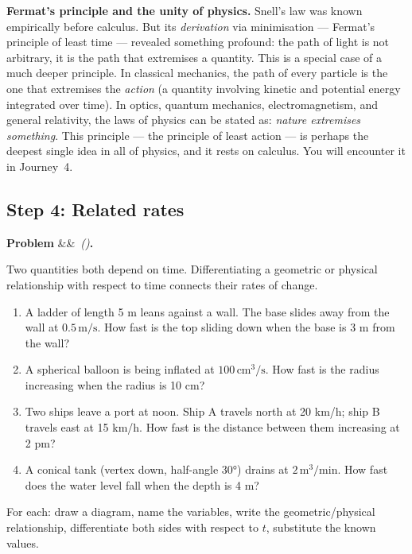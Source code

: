 \documentclass[12pt, a4paper]{article}
\newcounter{problem}
\newenvironment{problem}[1][]{%
  \refstepcounter{problem}%
  \par\vspace{6pt}%
  \noindent\textbf{\color{MidBlue}Problem \theproblem}%
  \ifx&#1&\else\ \textit{(#1)}\fi\textbf{.}\enskip
}{\par\vspace{4pt}}
\begin{document}
\begin{thought}
\textbf{Fermat's principle and the unity of physics.}
Snell's law was known empirically before calculus. But its \emph{derivation} via minimisation --- Fermat's principle of least time --- revealed something profound: the path of light is not arbitrary, it is the path that extremises a quantity. This is a special case of a much deeper principle. In classical mechanics, the path of every particle is the one that extremises the \emph{action} (a quantity involving kinetic and potential energy integrated over time). In optics, quantum mechanics, electromagnetism, and general relativity, the laws of physics can be stated as: \emph{nature extremises something}. This principle --- the principle of least action --- is perhaps the deepest single idea in all of physics, and it rests on calculus. You will encounter it in Journey~4.
\end{thought}

\subsection{Step 4: Related rates}

\begin{problem}
\label{prob:related_rates}
Two quantities both depend on time. Differentiating a geometric or physical relationship with respect to time connects their rates of change.

\begin{enumerate}[label=(\alph*), topsep=2pt]
  \item A ladder of length 5 m leans against a wall. The base slides away from the wall at $0.5\,\text{m/s}$. How fast is the top sliding down when the base is 3 m from the wall?
  \item A spherical balloon is being inflated at $100\,\text{cm}^3/\text{s}$. How fast is the radius increasing when the radius is 10 cm?
  \item Two ships leave a port at noon. Ship A travels north at 20 km/h; ship B travels east at 15 km/h. How fast is the distance between them increasing at 2 pm?
  \item A conical tank (vertex down, half-angle $30°$) drains at $2\,\text{m}^3/\text{min}$. How fast does the water level fall when the depth is 4 m?
\end{enumerate}
For each: draw a diagram, name the variables, write the geometric/physical relationship, differentiate both sides with respect to $t$, substitute the known values.
\end{problem}
\end{document}
